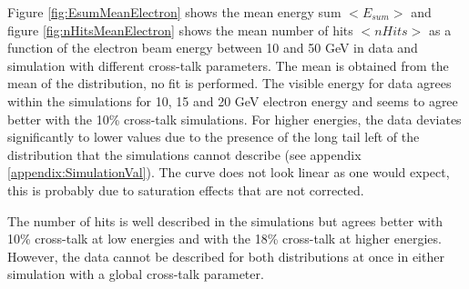 Figure \ref{fig:EsumMeanElectron} shows the mean energy sum $<E_{sum}>$ and figure \ref{fig:nHitsMeanElectron} shows the mean number of hits $<nHits>$ as a function of the electron beam energy between 10 and 50 GeV in data and simulation with different cross-talk parameters. The mean is obtained from the mean of the distribution, no fit is performed. The visible energy for data agrees within the simulations for 10, 15 and 20 GeV electron energy and seems to agree better with the 10\% cross-talk simulations. For higher energies, the data deviates significantly to lower values due to the presence of the long tail left of the distribution that the simulations cannot describe (see appendix \ref{appendix:SimulationVal}). The curve does not look linear as one would expect, this is probably due to saturation effects that are not corrected.

The number of hits is well described in the simulations but agrees better with 10\% cross-talk at low energies and with the 18\% cross-talk at higher energies. However, the data cannot be described for both distributions at once in either simulation with a global cross-talk parameter.

